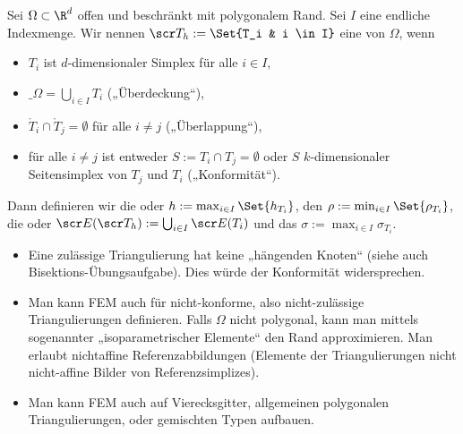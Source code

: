 \begin{df}[Triangulierung] \label{3.61}
	Sei $\Omega \subset \R^d$ offen und beschränkt mit polygonalem Rand.
	Sei $I$ eine endliche Indexmenge.
	Wir nennen $\scr T_h := \Set{T_i & i \in I}$ eine  von $\Omega$, wenn
	\begin{itemize}
		\item
			$T_i$ ist $d$-dimensionaler Simplex für alle $i \in I$,
		\item
			$\_\Omega = \bigcup_{i\in I} T_i$ („Überdeckung“),
		\item
			$\mathring T_i \cap \mathring T_j = \emptyset$ für alle $i \neq j$ („Überlappung“),
		\item
			für alle $i \neq j$ ist entweder $S := T_i \cap T_j = \emptyset$ oder $S$ $k$-dimensionaler Seitensimplex von $T_j$ und $T_i$ („Konformität“).
	\end{itemize}
	Dann definieren wir die  oder  $h := \max_{i \in I} \Set{h_{T_i}}$, den  $\rho := \min_{i\in I} \Set{\rho_{T_i}}$, die  oder  $\scr E(\scr T_h) := \bigcup_{i \in I} \scr E(T_i)$ und das  $\sigma := \max_{i\in I} \sigma_{T_i}$.
	\begin{note}
		\begin{itemize}
			\item
				Eine zulässige Triangulierung hat keine „hängenden Knoten“ (siehe auch Bisektions-Übungsaufgabe).
				Dies würde der Konformität widersprechen.
			\item
				Man kann FEM auch für nicht-konforme, also nicht-zulässige Triangulierungen definieren.
				Falls $\Omega$ nicht polygonal, kann man mittels sogenannter „isoparametrischer Elemente“ den Rand approximieren.
				Man erlaubt nichtaffine Referenzabbildungen (Elemente der Triangulierungen nicht nicht-affine Bilder von Referenzsimplizes).
			\item
				Man kann FEM auch auf Vierecksgitter, allgemeinen polygonalen Triangulierungen, oder gemischten Typen aufbauen.
		\end{itemize}
	\end{note}
\end{df}

